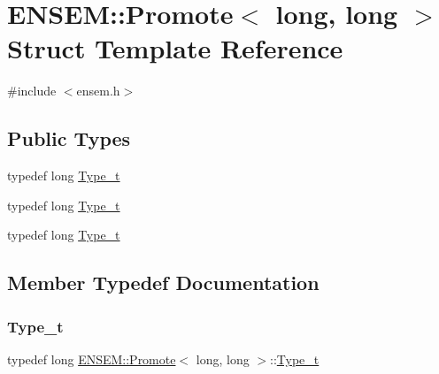 \hypertarget{structENSEM_1_1Promote_3_01long_00_01long_01_4}{}\section{E\+N\+S\+EM\+:\+:Promote$<$ long, long $>$ Struct Template Reference}
\label{structENSEM_1_1Promote_3_01long_00_01long_01_4}


{\ttfamily \#include $<$ensem.\+h$>$}

\subsection*{Public Types}
\begin{DoxyCompactItemize}
\item 
typedef long \mbox{\hyperlink{structENSEM_1_1Promote_3_01long_00_01long_01_4_aa01e24c09d90acda8fe0fb2f606bde86}{Type\+\_\+t}}
\item 
typedef long \mbox{\hyperlink{structENSEM_1_1Promote_3_01long_00_01long_01_4_aa01e24c09d90acda8fe0fb2f606bde86}{Type\+\_\+t}}
\item 
typedef long \mbox{\hyperlink{structENSEM_1_1Promote_3_01long_00_01long_01_4_aa01e24c09d90acda8fe0fb2f606bde86}{Type\+\_\+t}}
\end{DoxyCompactItemize}


\subsection{Member Typedef Documentation}
\mbox{\label{structENSEM_1_1Promote_3_01long_00_01long_01_4_aa01e24c09d90acda8fe0fb2f606bde86}} 
\subsubsection{\texorpdfstring{Type\_t}{Type\_t}\hspace{0.1cm}{\footnotesize\ttfamily [1/3]}}
{\footnotesize\ttfamily typedef long \mbox{\hyperlink{structENSEM_1_1Promote}{E\+N\+S\+E\+M\+::\+Promote}}$<$ long, long $>$\+::\mbox{\hyperlink{structENSEM_1_1Promote_3_01long_00_01long_01_4_aa01e24c09d90acda8fe0fb2f606bde86}{Type\+\_\+t}}}

\mbox{\label{structENSEM_1_1Promote_3_01long_00_01long_01_4_aa01e24c09d90acda8fe0fb2f606bde86}} 
